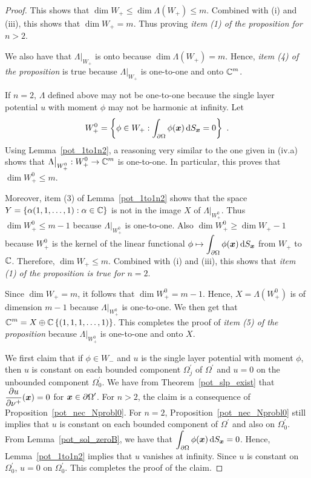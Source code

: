 \begin{proof}
This shows that $\dim W_+ \leq \dim \Lambda(W_+) \leq m$.  Combined
with (i) and (iii), this shows that $\dim W_+ = m$.  Thus proving
{\em item (1) of the proposition for $n>2$}.

We also have that $\displaystyle \Lambda\big|_{W_+}$ is onto because
$\dim \Lambda(W_+) = m$.  Hence, {\em item (4) of the proposition} is
true because $\displaystyle \Lambda\big|_{W_+}$ is one-to-one and onto
$\displaystyle \mathbb{C}^m$.

  If $n=2$, $\Lambda$ defined above may not be one-to-one
because the single layer potential $u$ with moment $\phi$ may not be
harmonic at infinity.  Let
\[
W_+^0 = \left\{ \phi \in W_+ : \int_{\partial \Omega} \phi({\bm{x}})
\,\mathrm{d}{S}_{{\bm{x}}} = 0 \right\} \ .
\]
Using Lemma~\ref{pot_1to1n2}, a reasoning very similar to the one
given in (iv.a) shows that
$\displaystyle \Lambda\big|_{W_+^0} : W_+^0 \rightarrow \mathbb{C}^m$ is
one-to-one.  In particular, this proves that $\displaystyle \dim W_+^0 \leq m$.

Moreover, item (3) of Lemma~\ref{pot_1to1n2} shows that the space
$\displaystyle Y = \left\{ \alpha (1,1,\ldots,1) : \alpha \in \mathbb{C} \right\}$
is not in the image $X$ of $\Lambda\big|_{W_+^0}$.
Thus $\displaystyle \dim W_+^0 \leq m-1$ because
$\Lambda\big|_{W_+^0}$ is one-to-one.
Also $\displaystyle \dim W_+^0 \geq \dim W_+ - 1$ because
$\displaystyle W_+^0$ is the kernel of the
linear functional
$\displaystyle \phi \mapsto \int_{\partial \Omega} \phi({\bm{x}}) \,\mathrm{d}{S}_{{\bm{x}}}$
from $W_+$ to $\mathbb{C}$.
Therefore, $\dim W_+ \leq m$.  Combined with (i) and (iii), this shows
that {\em item (1) of the proposition is true for $n=2$}.

Since $\dim W_+ = m$, it follows that $\displaystyle \dim W_+^0 = m - 1$.
Hence, $\displaystyle X = \Lambda(W_+^0)$ is of dimension $m-1$ because
$\displaystyle \Lambda\big|_{W_+^0}$ is one-to-one.
We then get that
$\displaystyle \mathbb{C}^m = X \oplus \mathbb{C}\left\{(1,1,1,\ldots,1)\right\}$.
This completes the proof of {\em item (5) of the proposition} because
$\displaystyle \Lambda\big|_{W_+^0}$ is one-to-one and onto $X$.

We first claim that if $\phi \in W_-$ and $u$ is the single layer
potential with moment $\phi$, then $u$ is constant on each bounded
component $\displaystyle \Omega_j^{\prime}$ of
$\displaystyle \Omega^{\prime}$ and $u=0$ on the unbounded
component $\displaystyle \Omega_0^{\prime}$.  We have from
Theorem~\ref{pot_slp_exist}
that $\displaystyle \frac{\partial{u}}{\partial \nu^+}({\bm{x}}) = 0$
for $\displaystyle {\bm{x}} \in \partial \Omega^{\prime}$.  For $n>2$,
the claim is a consequence of Proposition~\ref{pot_nec_Nprobl0}.  For $n=2$,
Proposition~\ref{pot_nec_Nprobl0} still implies that $u$ is constant
on each bounded component of $\displaystyle \Omega^{\prime}$ and also
on $\displaystyle \Omega_0^{\prime}$.
From Lemma~\ref{pot_sol_zeroB}, we have that
$\displaystyle \int_{\partial \Omega} \phi({\bm{x}}) \,\mathrm{d}{S}_{{\bm{x}}} = 0$.
Hence, Lemma~\ref{pot_1to1n2} implies that $u$ vanishes at infinity.  Since
$u$ is constant on $\displaystyle \Omega_0^{\prime}$, $u=0$ on
$\displaystyle \Omega_0^{\prime}$.
This completes the proof of the claim.


\end{proof}
